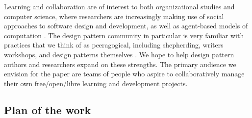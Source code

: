 


Learning and collaboration are of interest to both organizational studies and computer science, where researchers are increasingly making use of social approaches to software design and development, as well as agent-based models of computation \cite{minsky1967programming,poetry-workshop}.
%
The design pattern community in particular is very familiar with practices that we think of as peeragogical, including shepherding, writers workshops, and design patterns themselves \cite{harrison1999language,coplien1997pattern,meszaros1998pattern}.  We hope to help design pattern authors and researchers expand on these strengths.  The primary audience we envision for the paper are teams of people who aspire to collaboratively manage their own free/open/libre learning and development projects.

\subsection*{Plan of the work}


